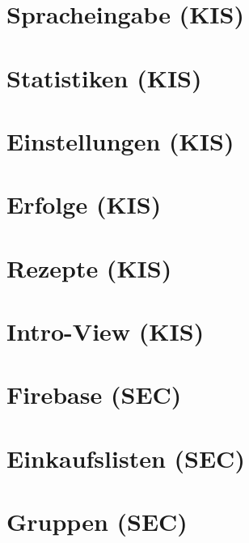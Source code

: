 \documentclass[
    headings=optiontotocandhead,%
    twoside,
    numbers=noenddot,%
    toc=flat, %
    12pt, %
    titlepage, %
    parskip=full, %
    listof=totoc, %
    listof=flat, %
    numbers=noenddot, %
    bibliography=totoc, %
    a4paper,DIV=14,
    BCOR=15mm,
]{scrbook}
\begin{document}
\chapter{Spracheingabe (KIS)}
\renewcommand{\kapitelautor}{Autor: Daniel Kisling}

\chapter{Statistiken (KIS)}
\renewcommand{\kapitelautor}{Autor: Daniel Kisling}

\chapter{Einstellungen (KIS)}
\renewcommand{\kapitelautor}{Autor: Daniel Kisling}


\chapter{Erfolge (KIS)}
\renewcommand{\kapitelautor}{Autor: Daniel Kisling}

\chapter{Rezepte (KIS)}
\renewcommand{\kapitelautor}{Autor: Daniel Kisling}

\chapter{Intro-View (KIS)}
\renewcommand{\kapitelautor}{Autor: Daniel Kisling}

\chapter{Firebase (SEC)}
\renewcommand{\kapitelautor}{Autor: Tobias Seczer}


\chapter{Einkaufslisten (SEC)}
\renewcommand{\kapitelautor}{Autor: Tobias Seczer}


\chapter{Gruppen (SEC)}
\renewcommand{\kapitelautor}{Autor: Tobias Seczer}

\end{document}
